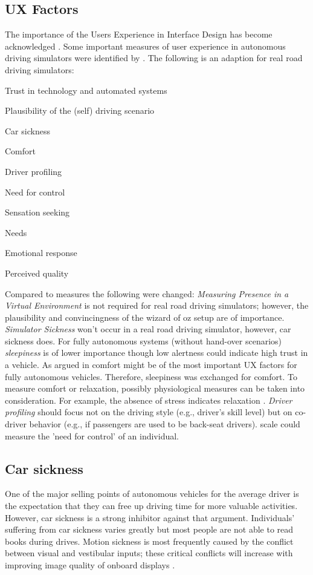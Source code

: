 \subsection{UX Factors}
\label{ssec:UXfactors}
The importance of the Users Experience in Interface Design has become acknowledged \citep{Soegaard2013TheEd.}. Some important measures of user experience in autonomous driving simulators were identified by \cite{Ive}. The following is an adaption for real road driving simulators: 

\begin{itemize*} 
  \item Trust in technology and automated systems\quad
  \item Plausibility of the (self) driving scenario\quad
  \item Car sickness\quad
  \item Comfort\quad
  \item Driver profiling\quad
  \item Need for control\quad
  \item Sensation seeking\quad
  \item Needs\quad
  \item Emotional response\quad
  \item Perceived quality\quad
\end{itemize*}

Compared to \cite{Ive} measures the following were changed: \emph{Measuring Presence in a Virtual Environment} is not required for real road driving simulators; however, the plausibility and convincingness of the wizard of oz setup are of importance. \emph{Simulator Sickness} won't occur in a real road driving simulator, however, car sickness does. For fully autonomous systems (without hand-over scenarios) \emph{sleepiness} is of lower importance though low alertness could indicate high trust in a vehicle. As argued in \emph{} comfort might be of the most important UX factors for fully autonomous vehicles. Therefore, sleepiness was exchanged for comfort. To measure comfort or relaxation, possibly physiological measures can be taken into consideration. For example, the absence of stress indicates relaxation \citep{Salai2016}. \emph{Driver profiling} should focus not on the driving style (e.g., driver’s skill level) but on co-driver behavior (e.g., if passengers are used to be back-seat drivers). \cite{Burger1979TheControl} scale could measure the 'need for control' of an individual.

\subsection{Car sickness}
\label{ssec:carsickness}
One of the major selling points of autonomous vehicles for the average driver is the expectation that they can free up driving time for more valuable activities. However, car sickness is a strong inhibitor against that argument. Individuals' suffering from car sickness varies greatly but most people are not able to read books during drives. Motion sickness is most frequently caused by the conflict between visual and vestibular inputs; these critical conflicts will increase with improving image quality of onboard displays \citep{Diels2016}.


